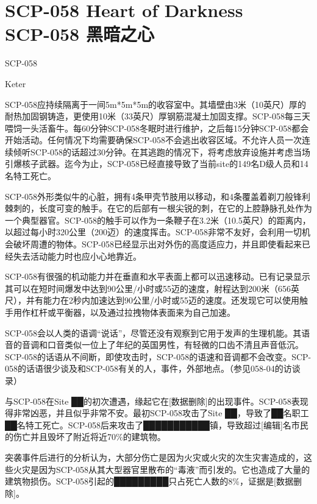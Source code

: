\chapter[SCP-058 黑暗之心]{
    SCP-058 Heart of Darkness\\
    SCP-058 黑暗之心
}

\label{chap:SCP-058}

SCP-058

Keter

SCP-058应持续隔离于一间5m*5m*5m的收容室中。其墙壁由3米（10英尺）厚的耐热加固钢铸造，更使用10米（33英尺）厚钢筋混凝土加固支撑。SCP-058每三天喂饲一头活畜牛。每60分钟SCP-058冬眠时进行维护，之后每15分钟SCP-058都会开始活动。任何情况下均需要确保SCP-058不会逃出收容区域。不允许人员一次连续倾听SCP-058的话超过30分钟。在其逃跑的情况下，将考虑放弃设施并考虑当场引爆核子武器。迄今为止，SCP-058已经直接导致了当前site的149名D级人员和14名特工死亡。

SCP-058外形类似牛的心脏，拥有4条甲壳节肢用以移动，和4条覆盖着剃刀般锋利棘刺的，长度可变的触手。在它的后部有一根尖锐的刺，在它的上腔静脉孔处作为一个典型器官。SCP-058的触手可以作为一条鞭子在3.2米（10.5英尺）的距离内，以超过每小时320公里（200迈）的速度挥击。SCP-058非常不友好，会利用一切机会破坏周遭的物体。SCP-058已经显示出对外伤的高度适应力，并且即使看起来已经失去活动能力时也应小心地靠近。

SCP-058有很强的机动能力并在垂直和水平表面上都可以迅速移动。已有记录显示其可以在短时间爆发中达到90公里\slash 小时或55迈的速度，射程达到200米（656英尺），并有能力在2秒内加速达到90公里\slash 小时或55迈的速度。还发现它可以使用触手用作杠杆或平衡器，以及通过拉拽物体表面来为自己加速。

SCP-058会以人类的语调“说话”，尽管还没有观察到它用于发声的生理机能。其语音的音调和口音类似一位上了年纪的英国男性，有轻微的口齿不清且声音低沉。SCP-058的话语从不间断，即使攻击时，SCP-058的语速和音调都不会改变。SCP-058的话语很少谈及和SCP-058有关的人，事件，外部地点。（参见058-04的访谈录）


与SCP-058在Site ██的初次遭遇，缘起它在{[}数据删除]的出现事件。SCP-058表现得非常凶恶，并且似乎非常不安。最初SCP-058攻击了Site ██，导致了██名职工██名特工死亡。SCP-058后来攻击了███████████镇，导致超过{[}编辑]名市民的伤亡并且毁坏了附近将近70\%的建筑物。

突袭事件后进行的分析认为，大部分伤亡是因为火灾或火灾的次生灾害造成的，这些火灾是因为SCP-058从其大型器官里散布的“毒液”而引发的。它也造成了大量的建筑物损伤。SCP-058引起的█████████只占死亡人数的8\%，证据是{[}数据删除]。

